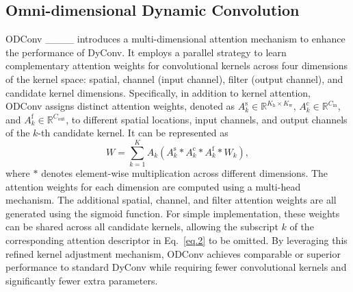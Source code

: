 \subsection{Omni-dimensional Dynamic Convolution \label{sec2.2}}
ODConv ____ introduces a multi-dimensional attention mechanism to enhance the performance of DyConv. It employs a parallel strategy to learn complementary attention weights for convolutional kernels across four dimensions of the kernel space: spatial, channel (input channel), filter (output channel), and candidate kernel dimensions. Specifically, in addition to kernel attention, ODConv assigns distinct attention weights, denoted as $A_k^\text{s} \in \mathbb{R}^{K_\text{h} \times K_\text{w}}$, $A_k^\text{c} \in \mathbb{R}^{C_{\text{in}}}$, and $A_k^\text{f} \in \mathbb{R}^{C_{\text{out}}}$, to different spatial locations, input channels, and output channels of the $k$-th candidate kernel. It can be represented as
\begin{equation}
    W = \sum_{k=1}^{K} A_k \left( A_k^\text{s} * A_k^\text{c} * A_k^\text{f} * W_k \right),
    \label{eq.2}
\end{equation}
where $*$ denotes element-wise multiplication across different dimensions. The attention weights for each dimension are computed using a multi-head mechanism. The additional spatial, channel, and filter attention weights are all generated using the sigmoid function. For simple implementation, these weights can be shared across all candidate kernels, allowing the subscript $k$ of the corresponding attention descriptor in Eq.~\ref{eq.2} to be omitted. By leveraging this refined kernel adjustment mechanism, ODConv achieves comparable or superior performance to standard DyConv while requiring fewer convolutional kernels and significantly fewer extra parameters.